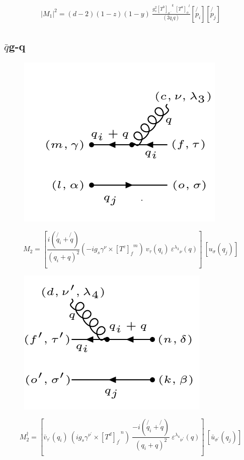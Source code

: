 \begin{equation}
\begin{split}
|M_1|^2=(d-2)(1-z)(1-y)\:\frac{g_s^2  {[T^b]_{o\:^{\prime}}}^k \: {[T^a]_o}^l }{(2q_i q)}
[\not{p_i}][\not{p_j}]
\end{split}
\end{equation}
\newpage

\subsection{$\bar{q}$g-q}

\begin{figure}[h!]
\centering
\includegraphics[scale=0.7]{images/qbargqM.png}
\end{figure}

\begin{equation}
M_2 = [\frac{i(\not{q_i} + \not{q})}{(q_i + q)^2} (-ig_s \gamma^{\nu}\times {[T^c]_f}^m) \:{v}_{\tau}(q_i)\: {\varepsilon^{\lambda_3}}_{\nu} (q)]\: [{u}_{\sigma}(q_j)]
\end{equation}
\begin{figure}[h!]
\centering
\includegraphics[scale=0.7]{images/qbargqMDega.png}
\end{figure}
\begin{equation}
M_2^{\dagger} = [\bar{v}_{{\tau}^{\prime}}(q_i) \: (ig_s \gamma^{{\nu}^{\prime}}\times {[T^d]_{f^{\prime}}}^n) \: \frac{-i(\not{q_i} + \not{q})}{(q_i + q)^2} \: {\varepsilon^{\lambda_4}}_{{\nu}^{\prime}} (q)]\: [\bar{u}_{{\sigma}^{\prime}}(q_j)]
\end{equation}

